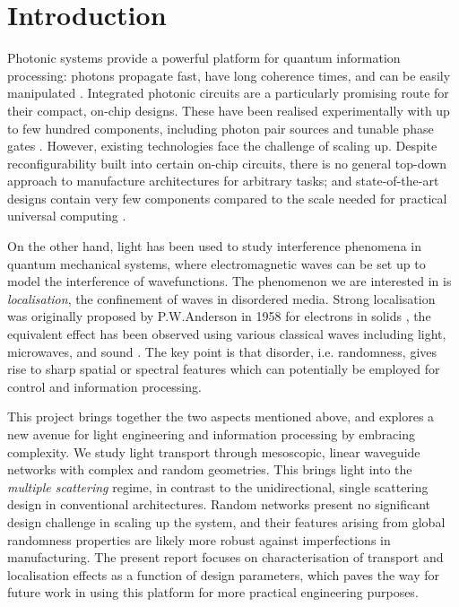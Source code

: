\chapter{Introduction}
Photonic systems provide a powerful platform for quantum information processing: photons propagate fast, have long coherence times, and can be easily manipulated \cite{Flamini2018}. Integrated photonic circuits are a particularly promising route for their compact, on-chip designs. These have been realised experimentally with up to few hundred components, including photon pair sources and tunable phase gates \cite{Harris2017,Shadbolt2012a,Wang2018}.
However, existing technologies face the challenge of scaling up. Despite reconfigurability built into certain on-chip circuits, there is no general top-down approach to manufacture architectures for arbitrary tasks; and state-of-the-art designs contain very few components compared to the scale needed for practical universal computing \cite{Flamini2018}. 

On the other hand, light has been used to study interference phenomena in quantum mechanical systems, where electromagnetic waves can be set up to model the interference of wavefunctions. The phenomenon we are interested in is \textit{localisation}, the confinement of waves in disordered media. Strong localisation was originally proposed by P.W.Anderson in 1958 for electrons in solids \cite{Anderson1958}, the equivalent effect has been observed using various classical waves including light, microwaves, and sound \cite{Lagendijk2009}. The key point is that disorder, i.e. randomness, gives rise to sharp spatial or spectral features which can potentially be employed for control and information processing.

This project brings together the two aspects mentioned above, and explores a new avenue for light engineering and information processing by embracing complexity. We study light transport through mesoscopic, linear waveguide networks with complex and random geometries. This brings light into the \textit{multiple scattering} regime, in contrast to the unidirectional, single scattering design in conventional architectures. Random networks present no significant design challenge in scaling up the system, and their features arising from global randomness properties are likely more robust against imperfections in manufacturing. The present report focuses on characterisation of transport and localisation effects as a function of design parameters, which paves the way for future work in using this platform for more practical engineering purposes. 

